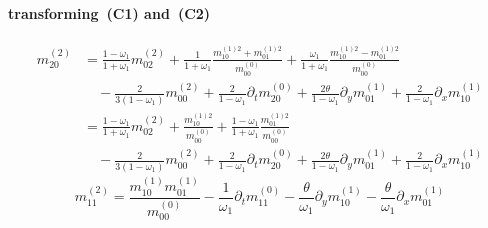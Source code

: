 \documentclass{article}
\begin{document}
  \paragraph{transforming~(C1) and~(C2)}
  \begin{equation}
    \tag{C3}
    \begin{aligned}
      m_{20}^{(2)} &= \frac{1-\omega_1}{1+\omega_1}m_{02}^{(2)}
      + \frac{1}{1+\omega_1}\frac{ m_{10}^{(1)2} + m_{01}^{(1)2}}{m_{00}^{(0)}}
      + \frac{\omega_1}{1+\omega_1} \frac{ m_{10}^{(1)2} - m_{01}^{(1)2}}{m_{00}^{(0)}}
      \\&\quad
      - \frac{ 2}{3(1-\omega_1)}m_{00}^{(2)}
      + \frac{2}{1-\omega_1}\partial_t m_{20}^{(0)} + \frac{2\theta}{1-\omega_1}\partial_y m_{01}^{(1)} + \frac{2}{1-\omega_1}\partial_x m_{10}^{(1)} \\
      &= \frac{1-\omega_1}{1+\omega_1}m_{02}^{(2)}
     + \frac{ m_{10}^{(1)2} }{m_{00}^{(0)}}
     + \frac{1-\omega_1}{1+\omega_1}\frac{m_{01}^{(1)2}}{m_{00}^{(0)}}
     \\&\quad
     - \frac{ 2}{3(1-\omega_1)}m_{00}^{(2)}
     + \frac{2}{1-\omega_1}\partial_t m_{20}^{(0)} + \frac{2\theta}{1-\omega_1}\partial_y m_{01}^{(1)} + \frac{2}{1-\omega_1}\partial_x m_{10}^{(1)}
    \end{aligned}
  \end{equation}
  \begin{equation}
    \tag{C4}
    m_{11}^{(2)} =  \frac{ m_{10}^{(1)}m_{01}^{(1)}}{m_{00}^{(0)}} - \frac{1}{\omega_1} \partial_t m_{11}^{(0)} - \frac{\theta}{\omega_1}\partial_y m_{10}^{(1)} - \frac{\theta}{\omega_1}\partial_x m_{01}^{(1)}
  \end{equation}
\end{document}
